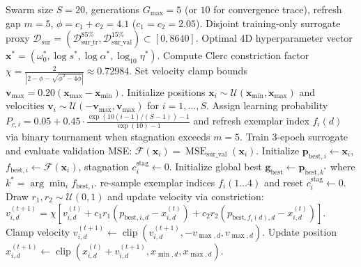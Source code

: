 \documentclass[pdflatex,sn-mathphys-num,referee,lineno]{sn-jnl}
\theoremstyle{thmstyleone}
\theoremstyle{thmstyletwo}
\theoremstyle{thmstylethree}
\begin{document}
\begin{algorithm}[htbp]
\caption{Clerc-Constrained Leak-Free CLPSO Surrogate Pre-Optimization}
\label{algo:clpso}
\begin{algorithmic}[1]
\Require Swarm size $S=20$, generations $G_{\max}=5$ (or $10$ for convergence trace), refresh gap $m=5$, $\phi = c_1 + c_2 = 4.1$ ($c_1 = c_2 = 2.05$).
\Require Disjoint training-only surrogate proxy $\mathcal{D}_{\mathrm{sur}} = (\mathcal{D}_{\mathrm{sur\_tr}}^{85\%}, \mathcal{D}_{\mathrm{sur\_val}}^{15\%}) \subset [0, 8640]$.
\Ensure Optimal 4D hyperparameter vector $\mathbf{x}^* = (\omega_0^*, \log s^*, \log\alpha^*, \log_{10}\eta^*)$.
\State Compute Clerc constriction factor $\chi = \frac{2}{|2 - \phi - \sqrt{\phi^2 - 4\phi}|} \approx 0.72984$.
\State Set velocity clamp bounds $\mathbf{v}_{\max} = 0.20 (\mathbf{x}_{\max} - \mathbf{x}_{\min})$.
\State Initialize positions $\mathbf{x}_i \sim \mathcal{U}(\mathbf{x}_{\min}, \mathbf{x}_{\max})$ and velocities $\mathbf{v}_i \sim \mathcal{U}(-\mathbf{v}_{\max}, \mathbf{v}_{\max})$ for $i = 1, \dots, S$.
\State Assign learning probability $P_{c,i} = 0.05 + 0.45 \cdot \frac{\exp(10(i-1)/(S-1)) - 1}{\exp(10) - 1}$ and refresh exemplar index $f_i(d)$ via binary tournament when stagnation exceeds $m=5$.
    \State Train 3-epoch surrogate and evaluate validation MSE: $\mathcal{F}(\mathbf{x}_i) = \operatorname{MSE}_{\mathrm{sur\_val}}(\mathbf{x}_i)$.
    \State Initialize $\mathbf{p}_{\mathrm{best}, i} \leftarrow \mathbf{x}_i$, $f_{\mathrm{best}, i} \leftarrow \mathcal{F}(\mathbf{x}_i)$, stagnation $c_i^{\mathrm{stag}} \leftarrow 0$.
\EndFor
\State Initialize global best $\mathbf{g}_{\mathrm{best}} \leftarrow \mathbf{p}_{\mathrm{best}, k^*}$ where $k^* = \arg\min_i f_{\mathrm{best}, i}$.
         re-sample exemplar indices $f_i(1 \dots 4)$ and reset $c_i^{\mathrm{stag}} \leftarrow 0$. \EndIf
            \State Draw $r_1, r_2 \sim \mathcal{U}(0, 1)$ and update velocity via constriction:
            \State \quad $v_{i,d}^{(t+1)} = \chi \left[ v_{i,d}^{(t)} + c_1 r_1 \left( p_{\mathrm{best}, i, d} - x_{i,d}^{(t)} \right) + c_2 r_2 \left( p_{\mathrm{best}, f_i(d), d} - x_{i,d}^{(t)} \right) \right]$.
            \State Clamp velocity $v_{i,d}^{(t+1)} \leftarrow \operatorname{clip}(v_{i,d}^{(t+1)}, -v_{\max, d}, v_{\max, d})$.
            \State Update position $x_{i,d}^{(t+1)} \leftarrow \operatorname{clip}(x_{i,d}^{(t)} + v_{i,d}^{(t+1)}, x_{\min, d}, x_{\max, d})$.

\end{algorithmic}
\end{algorithm}
\end{document}
